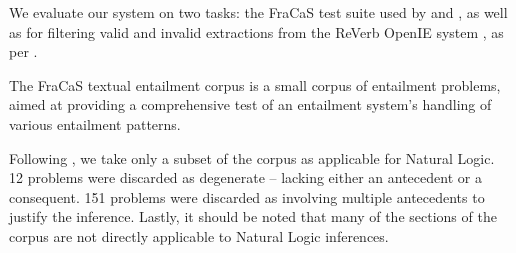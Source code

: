 
We evaluate our system on two tasks: the FraCaS test suite used
  by  and ,
  as well as for filtering valid and invalid extractions from the
  ReVerb OpenIE system \cite{key:2011fader-reverb}, as per
  .

%
%
The FraCaS textual entailment corpus \cite{key:1996cooper-fracas}
  is a small corpus of entailment problems, aimed at providing a
  comprehensive test of an entailment system's handling of various
  entailment patterns.

Following , we take only a subset
  of the corpus as applicable for Natural Logic.
12 problems were discarded as degenerate -- lacking either an antecedent or
  a consequent.
151 problems were discarded as involving multiple antecedents to
  justify the inference.
Lastly, it should be noted that many of the sections of the corpus
  are not directly applicable to Natural Logic inferences.

